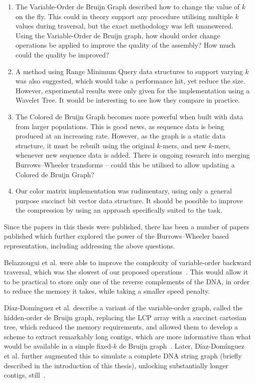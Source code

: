 \begin{enumerate}
\item The Variable-Order de Bruijn Graph described how to change the value of $k$ on the fly. This could in theory support any procedure utilising multiple $k$ values during traversal, but the exact methodology was left unanswered. Using the Variable-Order de Bruijn graph, how should order change operations be applied to improve the quality of the assembly? How much could the quality be improved?
  
\item A method using Range Minimum Query data structures to support varying $k$ was also suggested, which would take a performance hit, yet reduce the size. However, experimental results were only given for the implementation using a Wavelet Tree. It would be interesting to see how they compare in practice.
  
\item The Colored de Bruijn Graph becomes more powerful when built with data from larger populations. This is good news, as sequence data is being produced at an increasing rate. However, as the graph is a static data structure, it must be rebuilt using the original $k$-mers, and new $k$-mers, whenever new sequence data is added. There is ongoing research into merging Burrows--Wheeler transforms -- could this be utilised to allow updating a Colored de Bruijn Graph?
  
\item Our color matrix implementation was rudimentary, using only a general purpose succinct bit vector data structure. It should be possible to improve the compression by using an approach specifically suited to the task.
\end{enumerate}

Since the papers in this thesis were published, there has been a number of papers published which further explored the power of the Burrows--Wheeler based representation, including addressing the above questions.

Belazzougui et al. were able to improve the complexity of variable-order backward traversal, which was the slowest of our proposed operations~\cite{Bel18}. This would allow it to be practical to store only one of the reverse complements of the DNA, in order to reduce the memory it takes, while taking a smaller speed penalty.

Díaz-Domínguez et al. describe a variant of the variable-order graph, called the hidden-order de Bruijn graph, replacing the LCP array with a succinct cartesian tree, which reduced the memory requirements, and allowed them to develop a scheme to extract remarkably long contigs, which are more informative than what would be available in a simple fixed-$k$ de Bruijn graph~\cite{Dia18}. Later, Díaz-Domínguez et al. further augmented this to simulate a complete DNA string graph (briefly described in the introduction of this thesis), unlocking substantially longer contigs, still~\cite{Dia19}.

